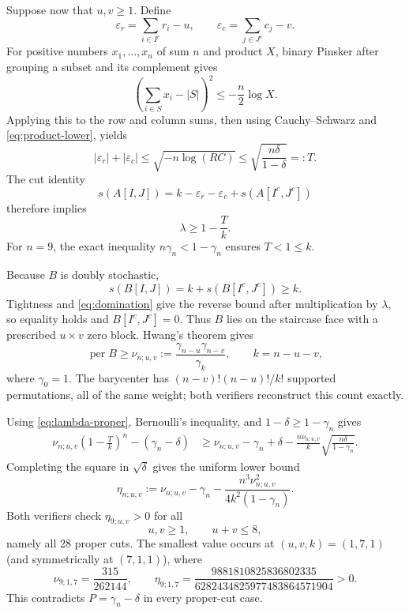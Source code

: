 \documentclass[11pt]{article}
\theoremstyle{remark}
\newcommand{\per}{\operatorname{per}}
\begin{document}
Suppose now that $u,v\ge1$.  Define
\[
 \varepsilon_r=\sum_{i\in I^c}r_i-u,
 \qquad
 \varepsilon_c=\sum_{j\in J^c}c_j-v.
\]
For positive numbers $x_1,\dots,x_n$ of sum $n$ and product $X$, binary
Pinsker after grouping a subset and its complement gives
\[
 \left(\sum_{i\in S}x_i-|S|\right)^2
 \le-\frac n2\log X.
\]
Applying this to the row and column sums, then using Cauchy--Schwarz and
\eqref{eq:product-lower}, yields
\begin{equation}\label{eq:T}
 |\varepsilon_r|+|\varepsilon_c|
 \le\sqrt{-n\log(RC)}
 \le\sqrt{\frac{n\delta}{1-\delta}}=:T.
\end{equation}
The cut identity
\[
 s(A[I,J])=k-\varepsilon_r-\varepsilon_c+s(A[I^c,J^c])
\]
therefore implies
\begin{equation}\label{eq:lambda-proper}
 \lambda\ge1-\frac Tk.
\end{equation}
For $n=9$, the exact inequality $n\gamma_n<1-\gamma_n$ ensures $T<1\le k$.

Because $B$ is doubly stochastic,
\[
 s(B[I,J])=k+s(B[I^c,J^c])\ge k.
\]
Tightness and \eqref{eq:domination} give the reverse bound after
multiplication by $\lambda$, so equality holds and $B[I^c,J^c]=0$.  Thus $B$
lies on the staircase face with a prescribed $u\times v$ zero block.
Hwang's theorem gives
\begin{equation}\label{eq:nu}
 \per B\ge\nu_{n;u,v}
 :=\frac{\gamma_{n-u}\gamma_{n-v}}{\gamma_k},
 \qquad k=n-u-v,
\end{equation}
where $\gamma_0=1$.  The barycenter has
$(n-v)!(n-u)!/k!$ supported permutations, all of the same weight; both
verifiers reconstruct this count exactly.

Using \eqref{eq:lambda-proper}, Bernoulli's inequality, and
$1-\delta\ge1-\gamma_n$ gives
\begin{align*}
 \nu_{n;u,v}\left(1-\frac Tk\right)^n-(\gamma_n-\delta)
 &\ge \nu_{n;u,v}-\gamma_n+\delta
 -\frac{n\nu_{n;u,v}}k
  \sqrt{\frac{n\delta}{1-\gamma_n}}.
\end{align*}
Completing the square in $\sqrt\delta$ gives the uniform lower bound
\begin{equation}\label{eq:eta}
 \eta_{n;u,v}
 :=\nu_{n;u,v}-\gamma_n
 -\frac{n^3\nu_{n;u,v}^2}{4k^2(1-\gamma_n)}.
\end{equation}
Both verifiers check $\eta_{9;u,v}>0$ for all
\[
 u,v\ge1,\qquad u+v\le8,
\]
namely all 28 proper cuts.  The smallest value occurs at
$(u,v,k)=(1,7,1)$ (and symmetrically at $(7,1,1)$), where
\[
 \nu_{9;1,7}=\frac{315}{262144},
 \qquad
 \eta_{9;1,7}=
 \frac{9881810825836802335}{6282434825977483864571904}>0.
\]
This contradicts $P=\gamma_n-\delta$ in every proper-cut case.
\end{document}
